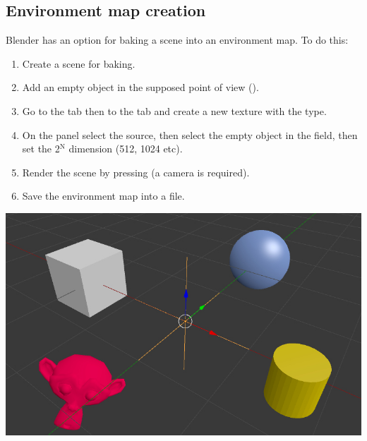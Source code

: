 \documentclass[a4paper,12pt,oneside]{sphinxmanual}
\begin{document}
\subsection{Environment map creation}
\label{textures:id18}
Blender has an option for baking a scene into an environment map. To do this:
\begin{enumerate}
\item {} 
Create a scene for baking.

\item {} 
Add an empty object in the supposed point of view ().

\item {} 
Go to the  tab then to the  tab and create a new texture with the  type.

\item {} 
On the  panel select the  source, then select the empty object in the  field, then set the 2$^{\text{N}}$ dimension (512, 1024 etc).

\item {} 
Render the scene by pressing  (a camera is required).

\item {} 
Save the environment map into a file.

\end{enumerate}

{\hfill\includegraphics[width=1.000\linewidth]{environment_map_baking_scene.jpg}\hfill}

\begin{DUlineblock}{0em}
\item[] 
\end{DUlineblock}
\end{document}

